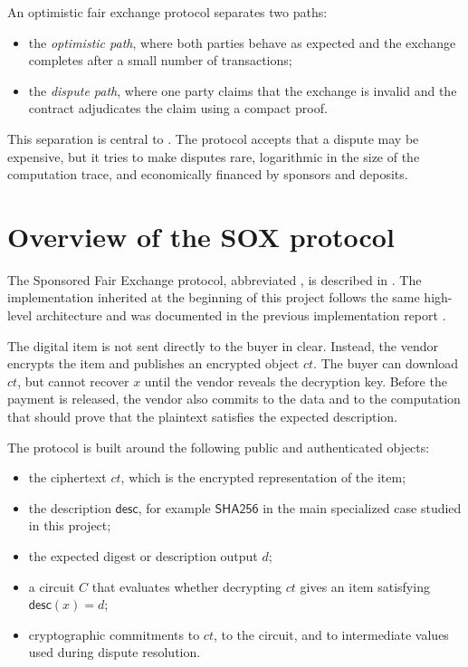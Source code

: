 An optimistic fair exchange protocol separates two paths:

\begin{itemize}
  \item the \emph{optimistic path}, where both parties behave as expected and the exchange
  completes after a small number of transactions;
  \item the \emph{dispute path}, where one party claims that the exchange is invalid and the
  contract adjudicates the claim using a compact proof.
\end{itemize}

This separation is central to \sox{}. The protocol accepts that a dispute may be expensive,
but it tries to make disputes rare, logarithmic in the size of the computation trace, and
economically financed by sponsors and deposits.

\section{Overview of the SOX protocol}

The Sponsored Fair Exchange protocol, abbreviated \sox{}, is described in
\cite{sox2026}. The implementation inherited at the beginning of this project follows the
same high-level architecture and was documented in the previous implementation report
\cite{hana2025}.

The digital item is not sent directly to the buyer in clear. Instead, the vendor encrypts
the item and publishes an encrypted object \(ct\). The buyer can download \(ct\), but cannot
recover \(x\) until the vendor reveals the decryption key. Before the payment is released,
the vendor also commits to the data and to the computation that should prove that the
plaintext satisfies the expected description.

The protocol is built around the following public and authenticated objects:

\begin{itemize}
  \item the ciphertext \(ct\), which is the encrypted representation of the item;
  \item the description \(\mathsf{desc}\), for example \(\mathsf{SHA256}\) in the main
  specialized case studied in this project;
  \item the expected digest or description output \(d\);
  \item a circuit \(C\) that evaluates whether decrypting \(ct\) gives an item satisfying
  \(\mathsf{desc}(x)=d\);
  \item cryptographic commitments to \(ct\), to the circuit, and to intermediate values used
  during dispute resolution.
\end{itemize}

